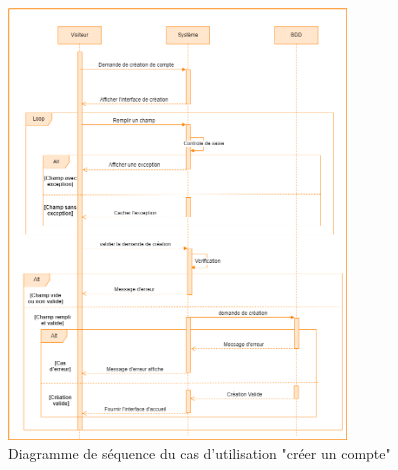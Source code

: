 \documentclass[edit,12pt,a4paper,ChapStyle,oneside,doubleinterligne]{report}
\begin{document}
\begin{figure}[h!]\label{fig:Diagramme cas1}
\centering
\includegraphics[width=0.8\textwidth]{images/creation de compte.png}
\caption{Diagramme de séquence du cas d'utilisation "créer un compte"}
\end{figure}


\clearpage
\end{document}
